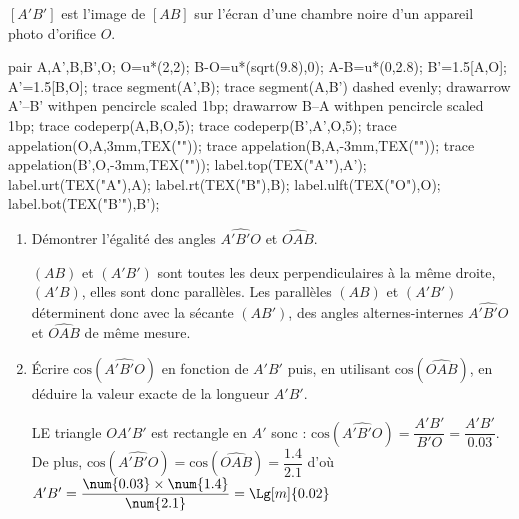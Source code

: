 \begin{corrige}
    $[A'B']$ est l'image de $[AB]$ sur l'écran d'une chambre noire d'un appareil photo d'orifice $O$.

    \begin{Geometrie}
        pair A,A',B,B',O;
        O=u*(2,2);
        B-O=u*(sqrt(9.8),0);
        A-B=u*(0,2.8);
        B'=1.5[A,O];
        A'=1.5[B,O];
        trace segment(A',B);
        trace segment(A,B') dashed evenly;
        drawarrow A'--B' withpen pencircle scaled 1bp;
        drawarrow B--A withpen pencircle scaled 1bp;
        trace codeperp(A,B,O,5);
        trace codeperp(B',A',O,5);
        trace appelation(O,A,3mm,TEX(""));
        trace appelation(B,A,-3mm,TEX(""));
        trace appelation(B',O,-3mm,TEX(""));
        label.top(TEX("A'"),A');
        label.urt(TEX("A"),A);
        label.rt(TEX("B"),B);
        label.ulft(TEX("O"),O);
        label.bot(TEX("B'"),B');
    \end{Geometrie}

    \begin{enumerate}
        \item Démontrer l'égalité des angles $\widehat{A'B'O}$ et $\widehat{OAB}$.
        
        {\color{red}$(AB)$ et $(A'B')$ sont toutes les deux perpendiculaires à la même droite, $(A'B)$, elles sont donc parallèles.
        Les parallèles $(AB)$ et $(A'B')$ déterminent donc avec la sécante $(AB')$, des angles alternes-internes $\widehat{A'B'O}$ et $\widehat{OAB}$ de même mesure.}
        \item Écrire $\text{cos}(\widehat{A'B'O})$ en fonction de $A'B'$ puis, en utilisant $\text{cos}(\widehat{OAB})$, en déduire la valeur exacte de la longueur $A'B'$.
        
        {\color{red}LE triangle $OA'B'$ est rectangle en $A'$ sonc : $\text{cos}(\widehat{A'B'O})=\dfrac{A'B'}{B'O}=\dfrac{A'B'}{\num{0.03}}$.
        De plus, $\text{cos}(\widehat{A'B'O})=\text{cos}(\widehat{OAB})=\dfrac{\num{1.4}}{\num{2.1}}$ d'où $A'B'=\dfrac{\num{0.03}\times\num{1.4}}{\num{2.1}}=\Lg[m]{0.02}$
        }
    \end{enumerate}
\end{corrige}

